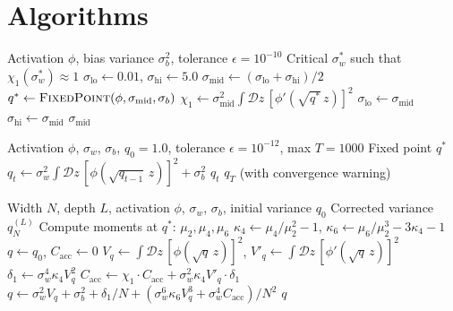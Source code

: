 \documentclass[10pt]{article}
\begin{document}
\section{Algorithms}
\label{app:algorithms}

\begin{algorithm}[h]
\caption{Edge-of-Chaos $\sigma_w^*$ Computation via Bisection}
\label{alg:eoc}
\begin{algorithmic}[1]
\Require Activation $\phi$, bias variance $\sigma_b^2$, tolerance $\epsilon = 10^{-10}$
\Ensure Critical $\sigma_w^*$ such that $\chi_1(\sigma_w^*) \approx 1$
\State $\sigma_{\text{lo}} \gets 0.01$, $\sigma_{\text{hi}} \gets 5.0$
    \State $\sigma_{\text{mid}} \gets (\sigma_{\text{lo}} + \sigma_{\text{hi}}) / 2$
    \State $q^* \gets \textsc{FixedPoint}(\phi, \sigma_{\text{mid}}, \sigma_b)$
    \State $\chi_1 \gets \sigma_{\text{mid}}^2 \int \mathcal{D}z\, [\phi'(\sqrt{q^*}\, z)]^2$
     $\sigma_{\text{lo}} \gets \sigma_{\text{mid}}$
    \Else{} $\sigma_{\text{hi}} \gets \sigma_{\text{mid}}$
    \EndIf
\EndWhile
\State \Return $\sigma_{\text{mid}}$
\end{algorithmic}
\end{algorithm}

\begin{algorithm}[h]
\caption{Variance Map Fixed-Point Iteration}
\label{alg:fixed-point}
\begin{algorithmic}[1]
\Require Activation $\phi$, $\sigma_w$, $\sigma_b$, $q_0 = 1.0$, tolerance $\epsilon = 10^{-12}$, max $T = 1000$
\Ensure Fixed point $q^*$
    \State $q_t \gets \sigma_w^2 \int \mathcal{D}z\, [\phi(\sqrt{q_{t-1}}\, z)]^2 + \sigma_b^2$
     \Return $q_t$
    \EndIf
\EndFor
\State \Return $q_T$ (with convergence warning)
\end{algorithmic}
\end{algorithm}

\begin{algorithm}[h]
\caption{$O(1/N^2)$ Finite-Width Variance Correction}
\label{alg:finite-width}
\begin{algorithmic}[1]
\Require Width $N$, depth $L$, activation $\phi$, $\sigma_w$, $\sigma_b$, initial variance $q_0$
\Ensure Corrected variance $q_N^{(L)}$
\State Compute moments at $q^*$: $\mu_2, \mu_4, \mu_6$
\State $\kappa_4 \gets \mu_4/\mu_2^2 - 1$, $\kappa_6 \gets \mu_6/\mu_2^3 - 3\kappa_4 - 1$
\State $q \gets q_0$, $C_{\mathrm{acc}} \gets 0$
    \State $V_q \gets \int \mathcal{D}z\, [\phi(\sqrt{q}\, z)]^2$, $V'_q \gets \int \mathcal{D}z\, [\phi'(\sqrt{q}\, z)]^2$
    \State $\delta_1 \gets \sigma_w^4 \kappa_4 V_q^2$
    \State $C_{\mathrm{acc}} \gets \chi_1 \cdot C_{\mathrm{acc}} + \sigma_w^2 \kappa_4 V'_q \cdot \delta_1$
    \State $q \gets \sigma_w^2 V_q + \sigma_b^2 + \delta_1/N + (\sigma_w^6 \kappa_6 V_q^3 + \sigma_w^4 C_{\mathrm{acc}})/N^2$
\EndFor
\State \Return $q$
\end{algorithmic}
\end{algorithm}
\end{document}
